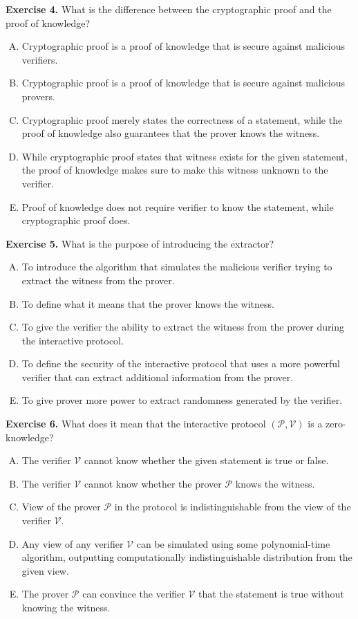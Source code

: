 \documentclass[../../book.tex]{subfiles}
\begin{document}
\textbf{Exercise 4.} What is the difference between the cryptographic proof and the proof of knowledge?
\begin{enumerate}[(A)]
    \item Cryptographic proof is a proof of knowledge that is secure against malicious verifiers.
    \item Cryptographic proof is a proof of knowledge that is secure against malicious provers.
    \item Cryptographic proof merely states the correctness of a statement, while the proof of knowledge also guarantees that the prover knows the witness.
    \item While cryptographic proof states that witness exists for the given statement, the proof of knowledge makes sure to make this witness unknown to the verifier.
    \item Proof of knowledge does not require verifier to know the statement, while cryptographic proof does.
\end{enumerate}

\textbf{Exercise 5.} What is the purpose of introducing the extractor?
\begin{enumerate}[(A)]
    \item To introduce the algorithm that simulates the malicious verifier trying to extract the witness from the prover.
    \item To define what it means that the prover knows the witness.
    \item To give the verifier the ability to extract the witness from the prover during the interactive protocol.
    \item To define the security of the interactive protocol that uses a more powerful verifier that can extract additional information from the prover.
    \item To give prover more power to extract randomness generated by the verifier.
\end{enumerate}

\textbf{Exercise 6.} What does it mean that the interactive protocol $(\mathcal{P}, \mathcal{V})$ is a zero-knowledge?
\begin{enumerate}[(A)]
    \item The verifier $\mathcal{V}$ cannot know whether the given statement is true or false.
    \item The verifier $\mathcal{V}$ cannot know whether the prover $\mathcal{P}$ knows the witness.
    \item View of the prover $\mathcal{P}$ in the protocol is indistinguishable from the view of the verifier $\mathcal{V}$.
    \item Any view of any verifier $\mathcal{V}$ can be simulated using some polynomial-time algorithm, outputting computationally indistinguishable distribution from the given view.
    \item The prover $\mathcal{P}$ can convince the verifier $\mathcal{V}$ that the statement is true without knowing the witness.
 \end{enumerate}
\end{document}
